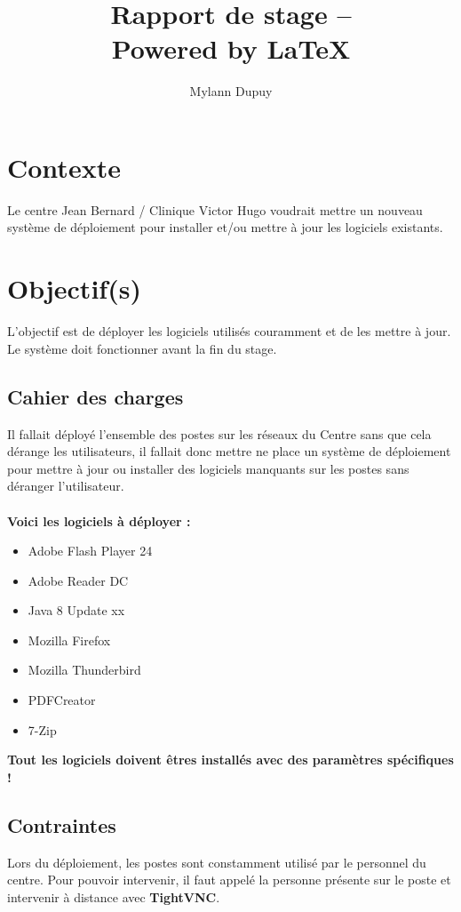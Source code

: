 \documentclass[11pt,a4paper,oneside]{article}
\author{Mylann Dupuy}
\title{Rapport de stage --  \\ Powered by \LaTeX}
\begin{document}
\maketitle
\newpage
\tableofcontents
\newpage
\section{Contexte}
Le centre Jean Bernard / Clinique Victor Hugo voudrait mettre un nouveau système de déploiement pour installer et/ou mettre à jour les logiciels existants.

\section{Objectif(s)}
L'objectif est de déployer les logiciels utilisés couramment et de les mettre à jour. Le système doit fonctionner avant la fin du stage. 

\subsection{Cahier des charges}
Il fallait déployé l'ensemble des postes sur les réseaux du Centre sans que cela dérange les utilisateurs, il fallait donc mettre ne place un système de déploiement pour mettre à jour ou installer des logiciels manquants sur les postes sans déranger l'utilisateur.\\ \\
\textbf{Voici les logiciels à déployer :}\\

\begin{itemize}
	\item Adobe Flash Player 24
	\item Adobe Reader DC
	\item Java 8 Update xx
	\item Mozilla Firefox
	\item Mozilla Thunderbird
	\item PDFCreator
	\item 7-Zip
\end{itemize}

\begin{center}
\textbf{Tout les logiciels doivent êtres installés avec des paramètres spécifiques !}
\end{center}
\subsection{Contraintes}
Lors du déploiement, les postes sont constamment utilisé par le personnel du centre. Pour pouvoir intervenir, il faut appelé la personne présente sur le poste et intervenir à distance avec \textbf{TightVNC}.
\end{document}
